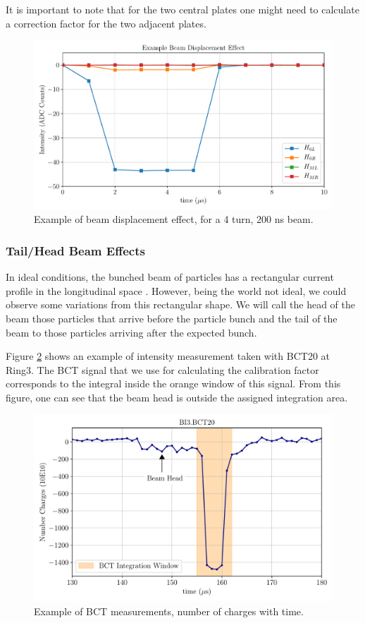 It is important to note that for the two central plates one might need to calculate a correction factor for the two adjacent plates. 

\begin{figure}[h]
    \centering
    \includegraphics[width=0.75\columnwidth]{Figure_BeamDisplacement/BeamDispEff.pdf}
    \caption{Example of beam displacement effect, for a 4 turn, 200 ns beam. }
    \label{fig:BeamDisplacement}
\end{figure}

\subsubsection{Tail/Head Beam Effects}

In ideal conditions, the bunched beam of particles has a rectangular current profile in the longitudinal space \parencite[][]{ref:headtail}. However, being the world not ideal, we could observe some variations from this rectangular shape. We will call the head of the beam those particles that arrive before the particle bunch and the tail of the beam to those particles arriving after the expected bunch. 

Figure \ref{fig:HeadTailBCT} shows an example of intensity measurement taken with BCT20 at Ring3. The BCT signal that we use for calculating the calibration factor corresponds to the integral inside the orange window of this signal. From this figure, one can see that the beam head is outside the assigned integration area. 

\begin{figure}[h]
    \centering
    \includegraphics[width=0.75\columnwidth]{Figures_BeamTailEffect/BCT_HeadTail.pdf}
    \caption{Example of BCT measurements, number of charges with time. }
    \label{fig:HeadTailBCT}
\end{figure}

